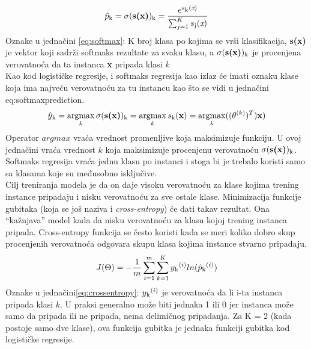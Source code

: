 \documentclass[a4paper,12pt]{report}
\DeclareMathOperator*{\argmax}{argmax}
\begin{document}
\begin{equation} \label{eq:softmax}
	\hat{p}\textsubscript{k} = \sigma(\textbf{s(x)})\textsubscript{k} =  \frac{e^{s\textsubscript{k}(\textit{x})}}{\sum_{j = 1}^{K} s\textsubscript{j}(\textit{x})}
\end{equation}
Oznake u jednačini \ref{eq:softmax}: K broj klasa po kojima se vrši klasifikacija, \textbf{s(x)} je vektor koji sadrži softmaks rezultate za svaku klasu, a $\sigma(\textbf{s(x)})\textsubscript{k}$ je procenjena verovatnoća da ta instanca \textbf{x} pripada klasi \textit{k}\\

Kao kod logističke regresije, i softmaks regresija kao izlaz će imati oznaku klase koja ima najveću verovatnoću za tu instancu kao što se vidi u jednačini {eq:softmaxprediction}.
\begin{equation} \label{eq:softmaxprediction}
	\hat{y}\textsubscript{k} = \argmax_k \sigma(\textbf{s(x)})\textsubscript{k} = \argmax_k s\textsubscript{k}(\textbf{x}) = \argmax_k ((\theta^{(k)})^T)\textbf{x})
\end{equation}
Operator $argmax$ vraća vrednost promenljive koja maksimizuje funkciju. U ovoj jednačini vraća vrednost $k$ koja maksimizuje procenjenu verovatnoću $\sigma(\textbf{s(x)})\textsubscript{k}$. Softmaks regresija vraća jednu klasu po instanci i stoga bi je trebalo koristi samo sa klasama koje su međusobno isključive. \\

Cilj treniranja modela je da on daje visoku verovatnoću za klase kojima trening instance pripadaju i nisku verovatnoću za sve ostale klase. Minimizacija funkcije gubitaka (koja se još naziva i \textit{cross-entropy}) će dati takav rezultat. Ona \enquote{kažnjava} model kada da nisku verovatnoću za klasu kojoj trening instanca pripada. Cross-entropy funkcija se često koristi kada se meri koliko dobro skup procenjenih verovatnoća odgovara skupu klasa kojima instance stvarno pripadaju. 
\begin{equation}\label{eq:crossentropy}
	J(\Theta) = - \frac{1}{m}\sum_{i = 1}^{m}\sum_{k = 1}^{K} y\textsubscript{k}^{(i)} ln(\hat{p}\textsubscript{k}^{(i)})
\end{equation}
Oznake u jednačini\ref{eq:crossentropy}: $y\textsubscript{k}^{(i)}$ je verovatnoća da li i-ta instanca pripada klasi $k$. 
U praksi generalno može biti jednaka 1 ili 0 jer instanca može samo da pripada ili ne pripada, nema delimičnog pripadanja. Za K = 2 (kada postoje samo dve klase), ova funkcija gubitka je jednaka funkciji gubitka kod logističke regresije. \\
\end{document}

